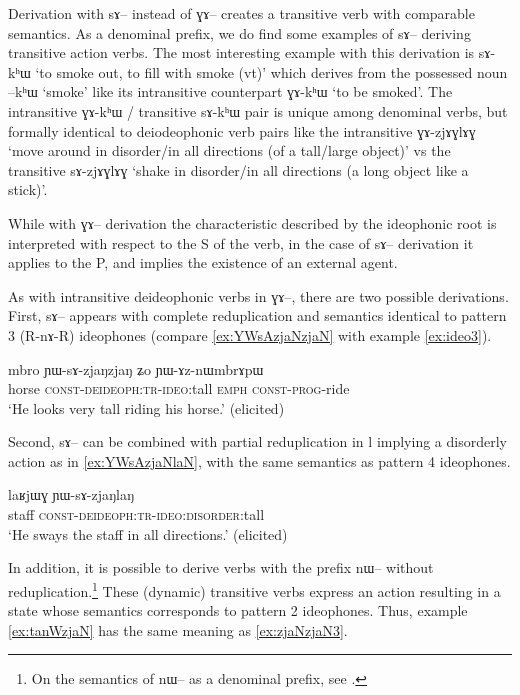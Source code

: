 \documentclass[oldfontcommands,oneside,a4paper,11pt]{article}
\newcommand{\ipa}[1]{{\phon \mbox{#1}}} %
\begin{document}
Derivation with \ipa{sɤ--} instead of \ipa{ɣɤ--} creates a transitive verb with comparable semantics. As a denominal prefix, we do find some examples of \ipa{sɤ--} deriving transitive action verbs. The most interesting example with this derivation is \ipa{sɤ-kʰɯ} `to smoke out, to fill with smoke (vt)' which derives from the possessed noun \ipa{--kʰɯ} `smoke' like its intransitive counterpart \ipa{ɣɤ-kʰɯ} `to be smoked'. The intransitive \ipa{ɣɤ-kʰɯ} / transitive  \ipa{sɤ-kʰɯ} pair  is unique among denominal verbs, but formally identical to deiodeophonic verb pairs like the intransitive \ipa{ɣɤ-zjɤɣlɤɣ} `move around in disorder/in all directions (of a tall/large object)' vs the transitive \ipa{sɤ-zjɤɣlɤɣ} `shake in disorder/in all directions (a long object like a stick)'.

While with   \ipa{ɣɤ--} derivation  the characteristic described by the ideophonic root is interpreted with respect to the S of the verb, in the case of   \ipa{sɤ--} derivation it applies to the P, and implies the existence of an external agent.

As with intransitive deideophonic verbs in \ipa{ɣɤ--}, there are two possible derivations. First, \ipa{sɤ--} appears with complete reduplication and semantics identical to pattern 3 (R-\ipa{nɤ}-R) ideophones (compare \ref{ex:YWsAzjaNzjaN} with example \ref{ex:ideo3}).

     \begin{exe}
     \ex \label{ex:YWsAzjaNzjaN}
\gll
\ipa{mbro} 	\ipa{ɲɯ-sɤ-zjaŋzjaŋ} 	\ipa{ʑo} 	\ipa{ɲɯ-ɤz-nɯmbrɤpɯ} \\
horse \textsc{const-deideoph:tr-ideo}:tall \textsc{emph} \textsc{const-prog}-ride \\
\glt  `He looks very tall riding his horse.' (elicited)
\end{exe}

Second,  \ipa{sɤ--}  can be combined with partial reduplication in \ipa{l} implying a disorderly action as in \ref{ex:YWsAzjaNlaN}, with the same semantics as pattern 4 ideophones.

     \begin{exe}
     \ex \label{ex:YWsAzjaNlaN}
\gll
 \ipa{laʁjɯɣ}  	\ipa{ɲɯ-sɤ-zjaŋlaŋ}  \\
  staff \textsc{const-deideoph:tr-ideo:disorder}:tall \\
  \glt `He sways the staff in all directions.' (elicited)
\end{exe}

In addition, it is possible to derive   verbs with the prefix \ipa{nɯ--} without reduplication.\footnote{On the semantics of \ipa{nɯ--} as a denominal prefix, see \citealt{jacques14antipassive}.} These (dynamic) transitive verbs express an action resulting in a state whose semantics corresponds to  pattern 2 ideophones. Thus, example \ref{ex:tanWzjaN} has the same meaning as \ref{ex:zjaNzjaN3}. 
\end{document}
